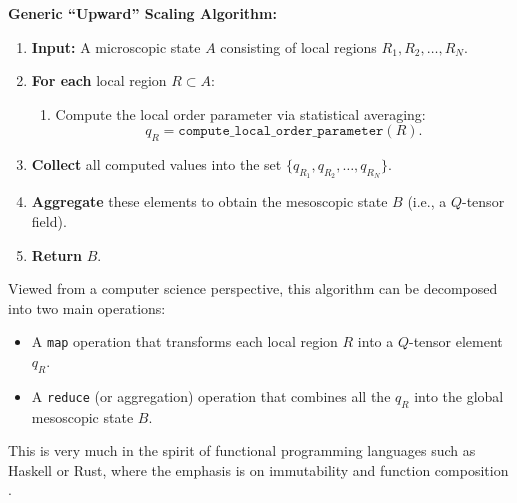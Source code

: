 \begin{formal}
	\textbf{Generic ``Upward'' Scaling Algorithm:}
	
	\begin{enumerate}[label=(\arabic*)]
		\item \textbf{Input:} A microscopic state \(A\) consisting of local regions \(R_1, R_2, \dots, R_N\).
		\item \textbf{For each} local region \(R \subset A\):
		\begin{enumerate}[label=(\alph*)]
			\item Compute the local order parameter via statistical averaging:
			\[
			q_R = \texttt{compute\_local\_order\_parameter}(R).
			\]
		\end{enumerate}
		\item \textbf{Collect} all computed values into the set \(\{q_{R_1}, q_{R_2}, \dots, q_{R_N}\}\).
		\item \textbf{Aggregate} these elements to obtain the mesoscopic state \(B\) (i.e., a \(Q\)-tensor field).
		\item \textbf{Return} \(B\).
	\end{enumerate}
\end{formal}

\begin{remark}
	Viewed from a computer science perspective, this algorithm can be decomposed into two main operations:
	\begin{itemize}
		\item A \texttt{map} operation that transforms each local region \(R\) into a \(Q\)-tensor element \(q_R\).
		\item A \texttt{reduce} (or aggregation) operation that combines all the \(q_R\) into the global mesoscopic state \(B\).
	\end{itemize}
	This is very much in the spirit of functional programming languages such as Haskell or Rust, where the emphasis is on immutability and function composition \cite{hudak1989conception}.
\end{remark}

